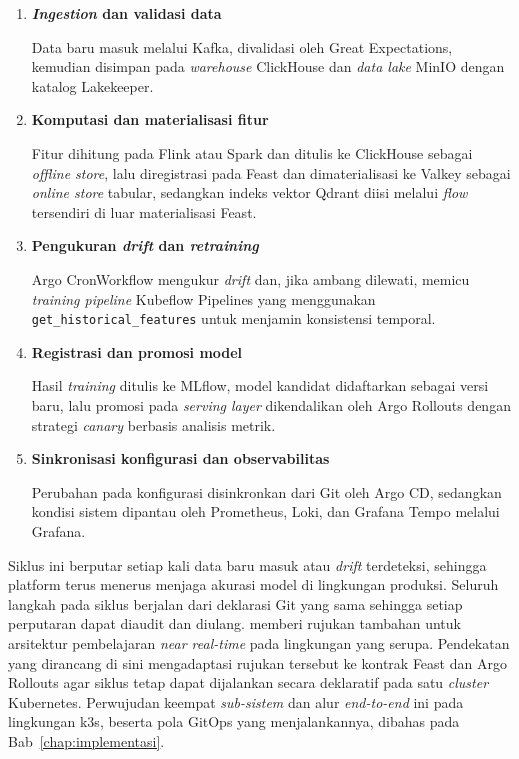 \vspace{0.5em}
\begin{enumerate}
    \item \textbf{\textit{Ingestion} dan validasi data}

    Data baru masuk melalui Kafka, divalidasi oleh Great Expectations, kemudian disimpan pada \textit{warehouse} ClickHouse dan \textit{data lake} MinIO dengan katalog Lakekeeper.

    \vspace{0.5em}

    \item \textbf{Komputasi dan materialisasi fitur}

    Fitur dihitung pada Flink atau Spark dan ditulis ke ClickHouse sebagai \textit{offline store}, lalu diregistrasi pada Feast dan dimaterialisasi ke Valkey sebagai \textit{online store} tabular, sedangkan indeks vektor Qdrant diisi melalui \textit{flow} tersendiri di luar materialisasi Feast.

    \vspace{0.5em}

    \item \textbf{Pengukuran \textit{drift} dan \textit{retraining}}

    Argo CronWorkflow mengukur \textit{drift} dan, jika ambang dilewati, memicu \textit{training pipeline} Kubeflow Pipelines yang menggunakan \texttt{get\_historical\_features} untuk menjamin konsistensi temporal.

    \vspace{0.5em}

    \item \textbf{Registrasi dan promosi model}

    Hasil \textit{training} ditulis ke MLflow, model kandidat didaftarkan sebagai versi baru, lalu promosi pada \textit{serving layer} dikendalikan oleh Argo Rollouts dengan strategi \textit{canary} berbasis analisis metrik.

    \vspace{0.5em}

    \item \textbf{Sinkronisasi konfigurasi dan observabilitas}

    Perubahan pada konfigurasi disinkronkan dari Git oleh Argo CD, sedangkan kondisi sistem dipantau oleh Prometheus, Loki, dan Grafana Tempo melalui Grafana.
\end{enumerate}

Siklus ini berputar setiap kali data baru masuk atau \textit{drift} terdeteksi, sehingga platform terus menerus menjaga akurasi model di lingkungan produksi. Seluruh langkah pada siklus berjalan dari deklarasi Git yang sama sehingga setiap perputaran dapat diaudit dan diulang. \textcite{rodrigues2025architecture} memberi rujukan tambahan untuk arsitektur pembelajaran \textit{near real-time} pada lingkungan yang serupa. Pendekatan yang dirancang di sini mengadaptasi rujukan tersebut ke kontrak Feast dan Argo Rollouts agar siklus tetap dapat dijalankan secara deklaratif pada satu \textit{cluster} Kubernetes. Perwujudan keempat \textit{sub-sistem} dan alur \textit{end-to-end} ini pada lingkungan k3s, beserta pola GitOps yang menjalankannya, dibahas pada Bab~\ref{chap:implementasi}.
